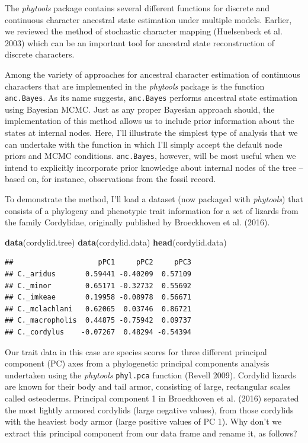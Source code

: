 \documentclass[fleqn,10pt,lineno]{wlpeerj} %
\newenvironment{Shaded}{\begin{snugshade}}{\end{snugshade}}
\newcommand{\FunctionTok}[1]{\textcolor[rgb]{0.13,0.29,0.53}{\textbf{#1}}}
\newcommand{\NormalTok}[1]{#1}
\begin{document}
The \emph{phytools} package contains several different functions for discrete and continuous character ancestral state estimation under multiple models. Earlier, we reviewed the method of stochastic character mapping (Huelsenbeck et al. 2003) which can be an important tool for ancestral state reconstruction of discrete characters.

Among the variety of approaches for ancestral character estimation of continuous characters that are implemented in the \emph{phytools} package is the function \texttt{anc.Bayes}. As its name suggests, \texttt{anc.Bayes} performs ancestral state estimation using Bayesian MCMC. Just as any proper Bayesian approach should, the implementation of this method allows us to include prior information about the states at internal nodes. Here, I'll illustrate the simplest type of analysis that we can undertake with the function in which I'll simply accept the default node priors and MCMC conditions. \texttt{anc.Bayes}, however, will be most useful when we intend to explicitly incorporate prior knowledge about internal nodes of the tree -- based on, for instance, observations from the fossil record.

To demonstrate the method, I'll load a dataset (now packaged with \emph{phytools}) that consists of a phylogeny and phenotypic trait information for a set of lizards from the family Cordylidae, originally published by Broeckhoven et al. (2016).

\begin{Shaded}
\begin{Highlighting}[]
\FunctionTok{data}\NormalTok{(cordylid.tree)}
\FunctionTok{data}\NormalTok{(cordylid.data)}
\FunctionTok{head}\NormalTok{(cordylid.data)}
\end{Highlighting}
\end{Shaded}

\begin{verbatim}
##                    pPC1     pPC2     pPC3
## C._aridus       0.59441 -0.40209  0.57109
## C._minor        0.65171 -0.32732  0.55692
## C._imkeae       0.19958 -0.08978  0.56671
## C._mclachlani   0.62065  0.03746  0.86721
## C._macropholis  0.44875 -0.75942  0.09737
## C._cordylus    -0.07267  0.48294 -0.54394
\end{verbatim}

Our trait data in this case are species scores for three different principal component (PC) axes from a phylogenetic principal components analysis undertaken using the \emph{phytools} \texttt{phyl.pca} function (Revell 2009). Cordylid lizards are known for their body and tail armor, consisting of large, rectangular scales called osteoderms. Principal component 1 in Broeckhoven et al. (2016) separated the most lightly armored cordylids (large negative values), from those cordylids with the heaviest body armor (large positive values of PC 1). Why don't we extract this principal component from our data frame and rename it, as follows?
\end{document}
